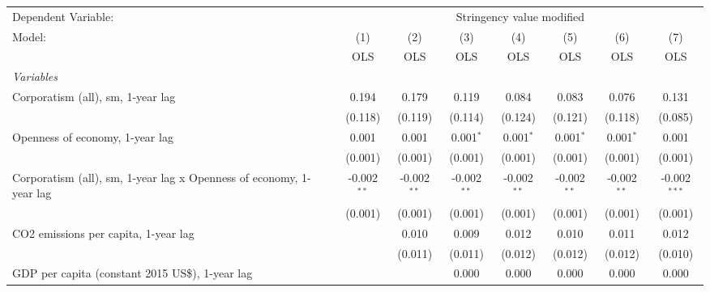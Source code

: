 
\begingroup
\centering
\begin{tabular}{lccccccc}
   \toprule
   Dependent Variable: & \multicolumn{7}{c}{Stringency value modified}\\
   Model:                                                              & (1)           & (2)           & (3)           & (4)           & (5)           & (6)           & (7)\\  
                                                                       &  OLS          & OLS           & OLS           & OLS           & OLS           & OLS           & OLS\\  
   \midrule
   \emph{Variables}\\
   Corporatism (all), sm, 1-year lag                                   & 0.194         & 0.179         & 0.119         & 0.084         & 0.083         & 0.076         & 0.131\\   
                                                                       & (0.118)       & (0.119)       & (0.114)       & (0.124)       & (0.121)       & (0.118)       & (0.085)\\   
   Openness of economy, 1-year lag                                     & 0.001         & 0.001         & 0.001$^{*}$   & 0.001$^{*}$   & 0.001$^{*}$   & 0.001$^{*}$   & 0.001\\   
                                                                       & (0.001)       & (0.001)       & (0.001)       & (0.001)       & (0.001)       & (0.001)       & (0.001)\\   
   Corporatism (all), sm, 1-year lag x Openness of economy, 1-year lag & -0.002$^{**}$ & -0.002$^{**}$ & -0.002$^{**}$ & -0.002$^{**}$ & -0.002$^{**}$ & -0.002$^{**}$ & -0.002$^{***}$\\   
                                                                       & (0.001)       & (0.001)       & (0.001)       & (0.001)       & (0.001)       & (0.001)       & (0.001)\\   
   CO2 emissions per capita, 1-year lag                                &               & 0.010         & 0.009         & 0.012         & 0.010         & 0.011         & 0.012\\   
                                                                       &               & (0.011)       & (0.011)       & (0.012)       & (0.012)       & (0.012)       & (0.010)\\   
   GDP per capita (constant 2015 US\$), 1-year lag                     &               &               & 0.000         & 0.000         & 0.000         & 0.000         & 0.000\\   

\end{tabular}
